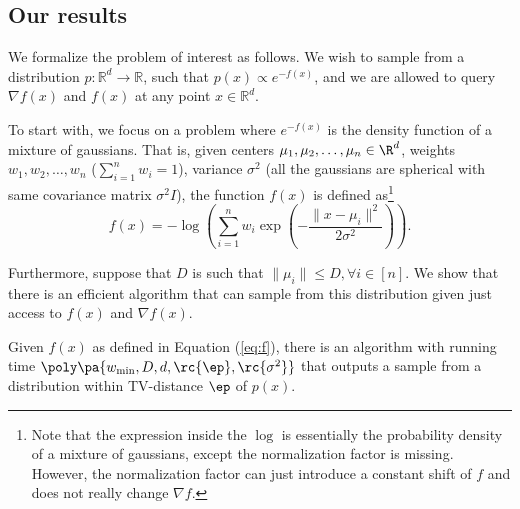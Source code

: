 \subsection{Our results}
\label{s:assumptions}

We formalize the problem of interest as follows. We wish to sample from a distribution $p: \mathbb{R}^d \to \mathbb{R}$, such that $p(x) \propto e^{-f(x)}$, and we are allowed to query $\nabla f(x)$ and $f(x)$ at any point $x \in \mathbb{R}^d$. 

To start with, we focus on a problem where $e^{-f(x)}$ is the density function of a mixture of gaussians. That is, given centers $\mu_1,\mu_2,\ldots, \mu_n \in \R^d$, weights $w_1,w_2,\ldots, w_n$ ($\sum_{i=1}^n w_i = 1$), variance $\sigma^2$ (all the gaussians are spherical with same covariance matrix $\sigma^2 I$), the function $f(x)$ is defined as\footnote{Note that the expression inside the $\log$ is essentially the probability density of a mixture of gaussians, except the normalization factor is missing. However, the normalization factor can just introduce a constant shift of $f$ and does not really change $\nabla f$.}
\begin{equation}
f(x) = - \log\left(\sum_{i=1}^n w_i \exp\left(-\frac{\|x - \mu_i\|^2}{2\sigma^2}\right)\right). %
\label{eq:f}
\end{equation}

  
Furthermore, suppose that $D$ is such that $\|\mu_i\| \leq D, \forall i \in [n]$. %
We show that there is an efficient algorithm that can sample from this distribution given just access to $f(x)$ and $\nabla f(x)$.

\begin{thm} Given $f(x)$ as defined in Equation (\ref{eq:f}), there is an algorithm with running time $\poly\pa{w_{\min},D,d,\rc{\ep}, \rc{\sigma^2}}$ that outputs a sample from a distribution within TV-distance $\ep$ of $p(x)$.
\end{thm}

